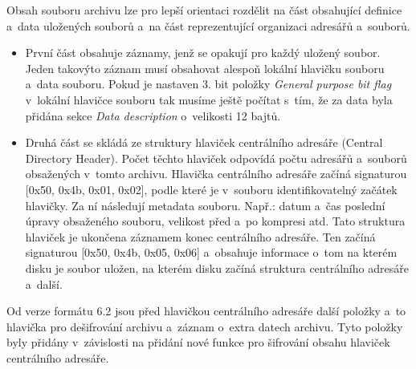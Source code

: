  Obsah souboru archivu lze pro lepší orientaci rozdělit na část obsahující definice a~data
uložených souborů a~na část reprezentující organizaci adresářů a~souborů.
\begin{itemize}
    \item První část obsahuje záznamy, jenž se opakují pro každý uložený soubor. Jeden takovýto
záznam musí obsahovat alespoň lokální hlavičku souboru a~data souboru. Pokud je nastaven
3. bit položky {\it General purpose bit flag} v~lokální hlavičce souboru tak musíme ještě počítat
s~tím, že za data byla přidána sekce {\it Data description} o~velikosti 12 bajtů.
    \item Druhá část se skládá ze struktury hlaviček centrálního adresáře (Central Directory
Header). Počet těchto hlaviček odpovídá počtu adresářů a~souborů obsažených v~tomto
archivu. Hlavička centrálního adresáře začíná signaturou [0x50, 0x4b, 0x01, 0x02], podle které je
v~souboru identifikovatelný začátek hlavičky. Za ní následují metadata souboru. Např.: datum a~čas
poslední úpravy obsaženého souboru, velikost před a~po kompresi atd. Tato struktura hlaviček je
ukončena záznamem konec centrálního adresáře. Ten začíná signaturou [0x50, 0x4b, 0x05, 0x06]
a~obsahuje informace o~tom na kterém disku je soubor uložen, na kterém disku začíná struktura
centrálního adresáře a~další.
\end{itemize}
Od verze formátu 6.2 jsou před hlavičkou centrálního adresáře další položky a~to hlavička
pro dešifrování archivu a~záznam o~extra datech archivu. Tyto položky byly přidány
v~závislosti na přidání nové funkce pro šifrování obsahu hlaviček centrálního adresáře.

